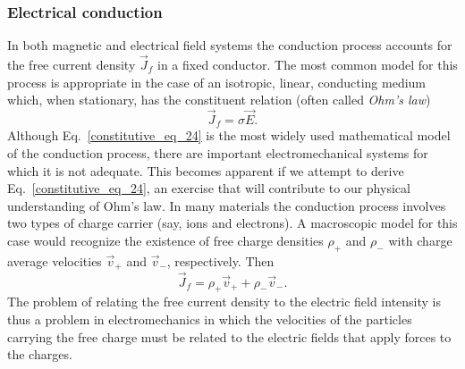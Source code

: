\documentclass[12pt,a4paper,oneside]{book}
\begin{document}
\begin{onehalfspace}
\subsubsection{Electrical conduction}
In both magnetic and electrical field systems the conduction process accounts for the free current density $\vec{J}_f$ in a fixed conductor. The most common model for this process is appropriate in the case of an isotropic, linear, conducting medium which, when stationary, has the constituent relation (often called \textit{Ohm's law})
\begin{equation}\label{constitutive_eq_24}
	\vec{J}_f=\sigma\vec{E}.
\end{equation}
Although Eq.~\eqref{constitutive_eq_24} is the most widely used mathematical model of the conduction process, there are important electromechanical systems for which it is not adequate. This becomes apparent if we attempt to derive Eq.~\eqref{constitutive_eq_24}, an exercise that will contribute to our physical understanding of Ohm's law. In many materials the conduction process involves two types of charge carrier (say, ions and electrons). A macroscopic model for this case would recognize the existence of free charge densities $\rho_{+}$ and $\rho_{-}$ with charge average velocities $\vec{v}_+$ and $\vec{v}_-$, respectively. Then 
\begin{equation}\label{constitutive_eq_25}
	\vec{J}_f=\rho_{+}\vec{v}_{+}+\rho_{-}\vec{v}_{-}.
\end{equation}
The problem of relating the free current density to the electric field intensity is thus a problem in electromechanics in which the velocities of the particles carrying the free charge must be related to the electric fields that apply forces to the charges.


\end{onehalfspace}
\end{document}
